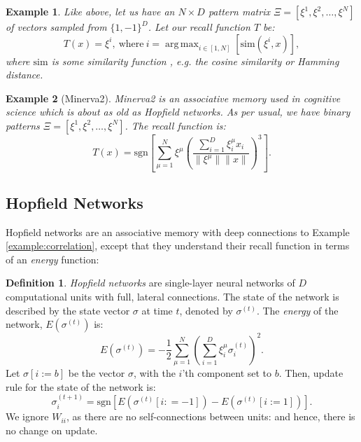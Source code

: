 \documentclass{article}
\DeclareMathOperator*{\argmax}{arg\,max}
\newtheorem{example}{Example}[subsection]
\theoremstyle{definition}
\newtheorem{definition}{Definition}[subsection]
\begin{document}
\begin{example}\label{example:argmax-am}
  Like above, let us have an $N \times D$ pattern matrix $\Xi = [\xi^1, \xi^2,
  \dots, \xi^N]$ of
  vectors sampled from $\{1, -1\}^D$. Let our recall function $T$ be:
  \begin{equation}
    T(x) = \xi^i,~\text{where}~i = \argmax_{i \in [1, N]}
    [\text{sim}(\xi^i, x)],
  \end{equation}
  where $\text{sim}$ is some similarity function \parencite{kelly_memory_2017},
  e.g. the cosine similarity or Hamming distance.
\end{example}

\begin{example}[Minerva2]\label{example:minerva2}
  Minerva2 \parencite{hintzman_minerva_1984} is an associative memory
  used in cognitive
  science which is about as old as Hopfield networks. As per usual, we have
  binary patterns $\Xi = [\xi^1, \xi^2, \dots, \xi^N]$. The recall function is:
  \begin{equation}
    T(x) = \text{sgn} \left[ \sum^N_{\mu=1} \xi^\mu \left(
    \frac{\sum^D_{i=1} \xi^\mu_i x_i}{\|\xi^\mu\| \|x\|} \right)^3 \right].
  \end{equation}
\end{example}

\subsection{Hopfield Networks}\label{sec:hopfield-networks}

Hopfield networks
\parencites{hopfield_neural_1982,hopfield_neurons_1984} are an associative
memory with deep connections to Example \ref{example:correlation},
except that they
understand their recall function in terms of an \textit{energy} function:

\begin{definition}\label{def:hopfield-nets}
  \textit{Hopfield networks} are single-layer neural networks of $D$
  computational units
  with full, lateral connections. The state of the network is described
  by the state vector $\sigma$ at time $t$, denoted by $\sigma^{(t)}$.
  The \textit{energy} of the network, $E (\sigma^{(t)})$ is:
  \begin{equation}
    E(\sigma^{(t)}) = - \frac{1}{2} \sum^N_{\mu=1} \left(\sum^D_{i=1}
    \xi^\mu_i \sigma^{(t)}_i\right)^2.
  \end{equation}
  Let $\sigma[i := b]$ be the vector $\sigma$, with the $i$'th
  component set to $b$. Then,
  update rule for the state of the network is:
  \begin{equation}
    \sigma^{(t+1)}_i = \text{sgn} \left[ E(\sigma^{(t)}[i : = -1]) -
    E(\sigma^{(t)}[i := 1]) \right].
  \end{equation}
  We ignore $W_{ii}$, as there are no self-connections between units: and hence,
  there is no change on update.
\end{definition}
\end{document}
